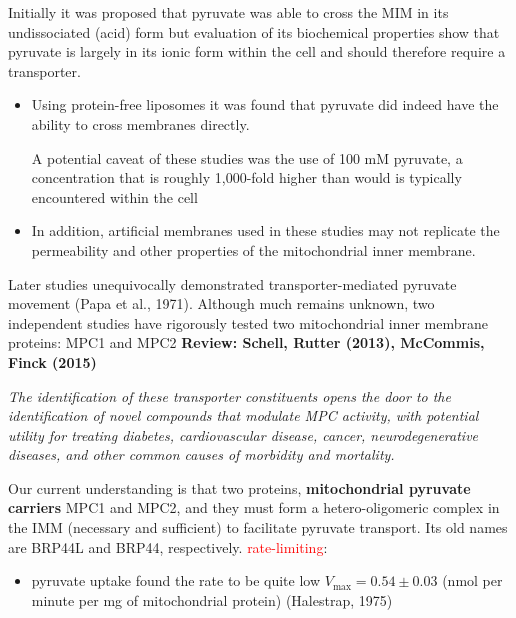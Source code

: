 \begin{mdframed}
Initially it was proposed that pyruvate was able to cross the MIM in
its undissociated (acid) form but evaluation of its biochemical properties show that
pyruvate is largely in its ionic form within the cell and should therefore
require a transporter.
\begin{itemize}
  \item  Using protein-free liposomes it was found that pyruvate did indeed have
  the ability to cross membranes directly.

  A potential caveat of these studies was the use of 100 mM pyruvate, a
  concentration that is roughly 1,000-fold higher than would is typically
  encountered within the cell

  \item   In addition, artificial membranes used in these studies may not replicate the
  permeability and other properties of the mitochondrial inner membrane.

\end{itemize}
Later studies unequivocally demonstrated transporter-mediated pyruvate movement
(Papa et al., 1971).
Although much remains unknown, two independent studies have rigorously tested
two mitochondrial inner membrane proteins: MPC1 and MPC2 {\bf Review: Schell,
Rutter (2013), McCommis, Finck (2015)}

{\it The identification of these transporter constituents opens the door to the
identification of novel compounds that modulate MPC activity, with potential
utility for treating diabetes, cardiovascular disease, cancer, neurodegenerative
diseases, and other common causes of morbidity and mortality.}

\end{mdframed}

Our current understanding is that two proteins, {\bf mitochondrial pyruvate
carriers} MPC1 and MPC2, and they must form a hetero-oligomeric complex in the
IMM (necessary and sufficient) to facilitate pyruvate transport. Its old names
are BRP44L and BRP44, respectively.
\textcolor{red}{rate-limiting}:
\begin{itemize}
  \item  pyruvate uptake found the rate to be quite low $V_\max = 0.54 \pm 0.03$
  (nmol per minute per mg of mitochondrial protein) (Halestrap, 1975)



\end{itemize}

